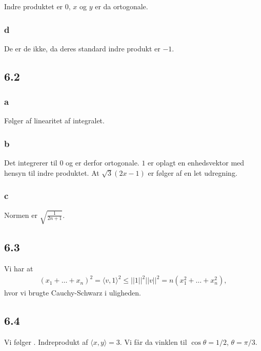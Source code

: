				Indre produktet er $0$, $x$ og $y$ er da ortogonale.

			\subsubsection{d}

				De er de ikke, da deres standard indre produkt er $-1$.

		\subsection{6.2}

			\subsubsection{a}

				Følger af linearitet af integralet.

			\subsubsection{b}

				Det integrerer til $0$ og er derfor ortogonale. $1$ er oplagt en enhedsvektor med hensyn til indre produktet. At $\sqrt{3}(2x-1)$ er følger af en let udregning. 

			\subsubsection{c}

				Normen er $\sqrt{\frac{1}{2n+1}}$.

		\subsection{6.3}

			Vi har at 
				\begin{align*}
					(x_1+\ldots+x_n)^2=\langle v,1\rangle^2\leq ||1||^2||v||^2=n(x_1^2+\ldots+x_n^2),
				\end{align*} 
			hvor vi brugte Cauchy-Schwarz i uligheden.

		\subsection{6.4}

			Vi følger \cite[Eksempel 6.1.6]{hesselholt2017}. Indreprodukt af $\langle x,y \rangle = 3$. Vi får da vinklen til $\cos \theta = 1/2$, $\theta = \pi/3$.

